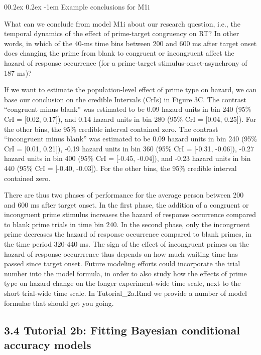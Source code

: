 \documentclass[
  english,
  man, donotrepeattitle,floatsintext]{apa6}
\makeatletter
\let\oldparagraph\paragraph
\renewcommand{\paragraph}{
    \@ifstar
      \xxxParagraphStar
      \xxxParagraphNoStar
  }
\newcommand{\xxxParagraphStar}[1]{\oldparagraph*{#1}\mbox{}}
\newcommand{\xxxParagraphNoStar}[1]{\oldparagraph{#1}\mbox{}}
\renewcommand{\paragraph}{\@startsection{paragraph}{4}{\parindent}%
  {0\baselineskip \@plus 0.2ex \@minus 0.2ex}%
  {-1em}%
  {\normalfont\normalsize\bfseries\itshape\typesectitle}}
\makeatother
\begin{document}
\paragraph{Example conclusions for M1i}\label{example-conclusions-for-m1i}

What can we conclude from model M1i about our research question, i.e., the temporal dynamics of the effect of prime-target congruency on RT? In other words, in which of the 40-ms time bins between 200 and 600 ms after target onset does changing the prime from blank to congruent or incongruent affect the hazard of response occurrence (for a prime-target stimulus-onset-asynchrony of 187 ms)?

If we want to estimate the population-level effect of prime type on hazard, we can base our conclusion on the credible Intervals (CrIs) in Figure 3C. The contrast ``congruent minus blank'' was estimated to be 0.09 hazard units in bin 240 (95\% CrI = {[}0.02, 0.17{]}), and 0.14 hazard units in bin 280 (95\% CrI = {[}0.04, 0.25{]}). For the other bins, the 95\% credible interval contained zero.
The contrast ``incongruent minus blank'' was estimated to be 0.09 hazard units in bin 240 (95\% CrI = {[}0.01, 0.21{]}), -0.19 hazard units in bin 360 (95\% CrI = {[}-0.31, -0.06{]}), -0.27 hazard units in bin 400 (95\% CrI = {[}-0.45, -0.04{]}), and -0.23 hazard units in bin 440 (95\% CrI = {[}-0.40, -0.03{]}). For the other bins, the 95\% credible interval contained zero.

There are thus two phases of performance for the average person between 200 and 600 ms after target onset. In the first phase, the addition of a congruent or incongruent prime stimulus increases the hazard of response occurrence compared to blank prime trials in time bin 240. In the second phase, only the incongruent prime decreases the hazard of response occurrence compared to blank primes, in the time period 320-440 ms. The sign of the effect of incongruent primes on the hazard of response occurrrence thus depends on how much waiting time has passed since target onset. Future modeling efforts could incorporate the trial number into the model formula, in order to also study how the effects of prime type on hazard change on the longer experiment-wide time scale, next to the short trial-wide time scale. In Tutorial\_2a.Rmd we provide a number of model formulae that should get you going.

\subsection{3.4 Tutorial 2b: Fitting Bayesian conditional accuracy models}\label{tutorial-2b-fitting-bayesian-conditional-accuracy-models}
\end{document}
